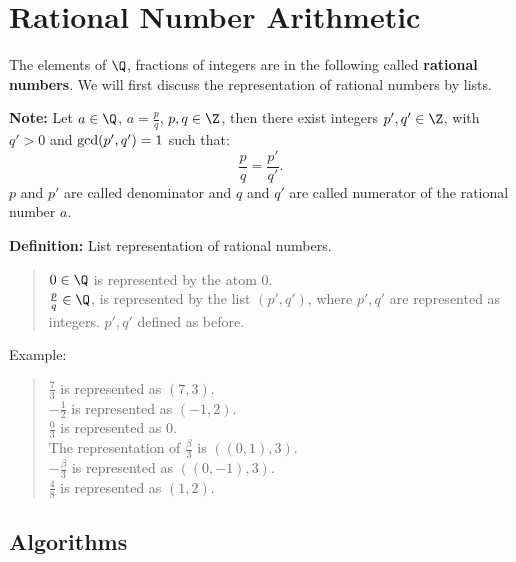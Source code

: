 


\section{Rational Number Arithmetic}

The elements of $\Q$,
fractions of integers are in the following 
called {\bf rational numbers}. 
We will first discuss the representation of 
rational numbers by lists.

{\bf Note:} 
Let $a \in \Q$, $a = \frac{p}{q}$, $p, q \in \Z$, then there
exist integers $p', q' \in \Z$,
with $q' > 0$ and $\mbox{\rm gcd}(p',q') = 1$ such that:
\begin{displaymath}
       \frac{p}{q} = \frac{p'}{q'}.
\end{displaymath}
$p$ and $p'$ are called denominator and 
$q$ and $q'$ are called numerator of the 
rational number $a$.  

{\bf Definition:} List representation of rational numbers.
\begin{quote}
       $0 \in \Q$ is represented by the atom $0$.
       \\
       $\frac{p}{q} \in \Q$, is represented 
       by the list $(p',q')$, where $p', q'$ are represented as 
       integers. $p', q'$ defined as before.  
\end{quote}

Example: 
\begin{quote}
    $\displaystyle\frac{7}{3}$ is represented as $(7,3)$. \\
    $\displaystyle-\frac{1}{2}$ is represented as $(-1,2)$. \\
    $\displaystyle\frac{0}{3}$ is represented as $0$. \\
    The representation of $\displaystyle\frac{\beta}{3}$ is $((0,1),3)$. \\
    $\displaystyle-\frac{\beta}{3}$ is represented as $((0,-1),3)$. \\
    $\displaystyle\frac{4}{8}$ is represented as $(1,2)$. 
\end{quote}


\subsection{Algorithms}

